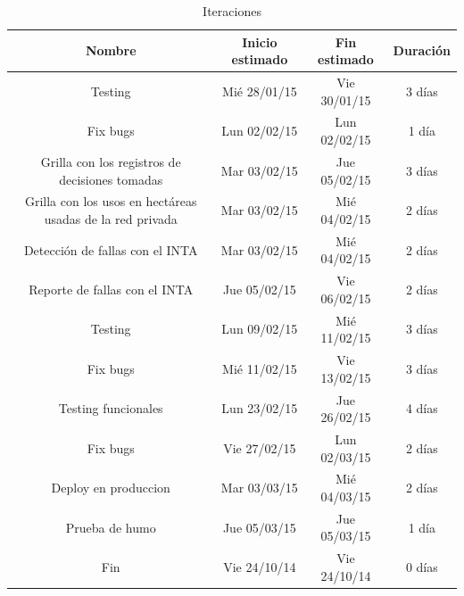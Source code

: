 \begin{landscape}
\begin{table}[ht]
\caption{Iteraciones}
\centering 
\begin{tabular}{c c c c}
\hline
Nombre                                                      & Inicio estimado & Fin estimado & Duración \\
\hline
Testing                                                     & Mié 28/01/15    & Vie 30/01/15 & 3 días   \\
Fix bugs                                                    & Lun 02/02/15    & Lun 02/02/15 & 1 día    \\
Grilla con los registros de decisiones tomadas              & Mar 03/02/15    & Jue 05/02/15 & 3 días   \\
Grilla con los usos en hectáreas usadas de la red privada   & Mar 03/02/15    & Mié 04/02/15 & 2 días   \\
Detección de fallas con el INTA                             & Mar 03/02/15    & Mié 04/02/15 & 2 días   \\
Reporte de fallas con el INTA                               & Jue 05/02/15    & Vie 06/02/15 & 2 días   \\
Testing                                                     & Lun 09/02/15    & Mié 11/02/15 & 3 días   \\
Fix bugs                                                    & Mié 11/02/15    & Vie 13/02/15 & 3 días   \\
Testing funcionales                                         & Lun 23/02/15    & Jue 26/02/15 & 4 días   \\
Fix bugs                                                    & Vie 27/02/15    & Lun 02/03/15 & 2 días   \\
Deploy en produccion                                        & Mar 03/03/15    & Mié 04/03/15 & 2 días   \\
Prueba de humo                                              & Jue 05/03/15    & Jue 05/03/15 & 1 día    \\
Fin                                                         & Vie 24/10/14    & Vie 24/10/14 & 0 días   \\

\end{tabular}
\end{table}
\end{landscape}
